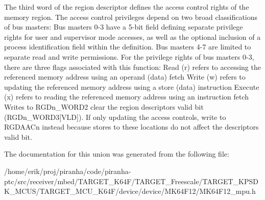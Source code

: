 The third word of the region descriptor defines the access control rights of the memory region. The access control privileges depend on two broad classifications of bus masters\+: Bus masters 0-\/3 have a 5-\/bit field defining separate privilege rights for user and supervisor mode accesses, as well as the optional inclusion of a process identification field within the definition. Bus masters 4-\/7 are limited to separate read and write permissions. For the privilege rights of bus masters 0-\/3, there are three flags associated with this function\+: Read (r) refers to accessing the referenced memory address using an operand (data) fetch Write (w) refers to updating the referenced memory address using a store (data) instruction Execute (x) refers to reading the referenced memory address using an instruction fetch Writes to R\+G\+Dn\+\_\+\+W\+O\+R\+D2 clear the region descriptor\textquotesingle{}s valid bit (R\+G\+Dn\+\_\+\+W\+O\+R\+D3\mbox{[}V\+LD\mbox{]}). If only updating the access controls, write to R\+G\+D\+A\+A\+Cn instead because stores to these locations do not affect the descriptor\textquotesingle{}s valid bit. 

The documentation for this union was generated from the following file\+:\begin{DoxyCompactItemize}
\item 
/home/erik/proj/piranha/code/piranha-\/ptc/src/receiver/mbed/\+T\+A\+R\+G\+E\+T\+\_\+\+K64\+F/\+T\+A\+R\+G\+E\+T\+\_\+\+Freescale/\+T\+A\+R\+G\+E\+T\+\_\+\+K\+P\+S\+D\+K\+\_\+\+M\+C\+U\+S/\+T\+A\+R\+G\+E\+T\+\_\+\+M\+C\+U\+\_\+\+K64\+F/device/device/\+M\+K64\+F12/M\+K64\+F12\+\_\+mpu.\+h\end{DoxyCompactItemize}
